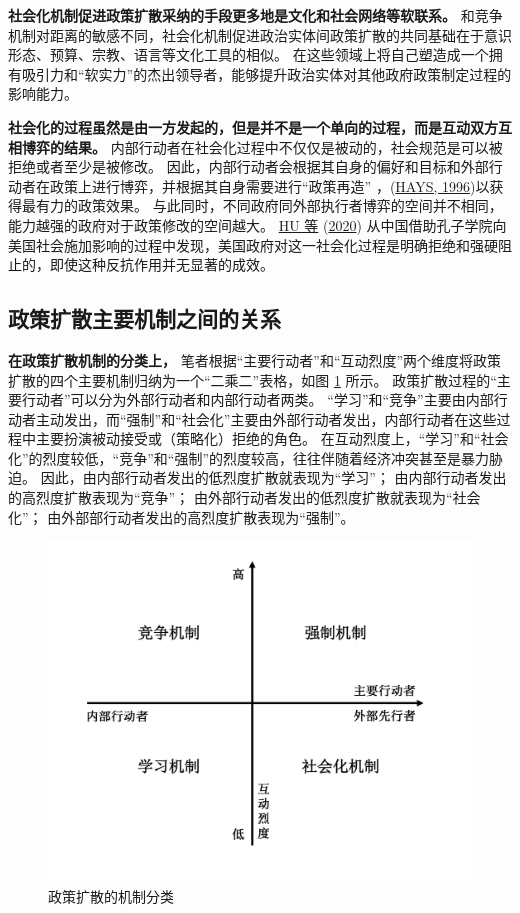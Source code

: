 \documentclass[
  12pt,
]{ctexart}
\begin{document}
\textbf{社会化机制促进政策扩散采纳的手段更多地是文化和社会网络等软联系。}
和竞争机制对距离的敏感不同，社会化机制促进政治实体间政策扩散的共同基础在于意识形态、预算、宗教、语言等文化工具的相似。
在这些领域上将自己塑造成一个拥有吸引力和``软实力''的杰出领导者，能够提升政治实体对其他政府政策制定过程的影响能力。

\textbf{社会化的过程虽然是由一方发起的，但是并不是一个单向的过程，而是互动双方互相博弈的结果。}
内部行动者在社会化过程中不仅仅是被动的，社会规范是可以被拒绝或者至少是被修改。
因此，内部行动者会根据其自身的偏好和目标和外部行动者在政策上进行博弈，并根据其自身需要进行``政策再造'' ，(\protect\hyperlink{ref-Hays1996}{HAYS, 1996})以获得最有力的政策效果。
与此同时，不同政府同外部执行者博弈的空间并不相同，能力越强的政府对于政策修改的空间越大。
\protect\hyperlink{ref-HuEtAl2020a}{HU 等} (\protect\hyperlink{ref-HuEtAl2020a}{2020}) 从中国借助孔子学院向美国社会施加影响的过程中发现，美国政府对这一社会化过程是明确拒绝和强硬阻止的，即使这种反抗作用并无显著的成效。

\hypertarget{ux653fux7b56ux6269ux6563ux4e3bux8981ux673aux5236ux4e4bux95f4ux7684ux5173ux7cfb}{%
\subsection{政策扩散主要机制之间的关系}\label{ux653fux7b56ux6269ux6563ux4e3bux8981ux673aux5236ux4e4bux95f4ux7684ux5173ux7cfb}}

\textbf{在政策扩散机制的分类上，}
笔者根据``主要行动者''和``互动烈度''两个维度将政策扩散的四个主要机制归纳为一个``二乘二''表格，如图 \ref{fig:Classification} 所示。
政策扩散过程的``主要行动者''可以分为外部行动者和内部行动者两类。
``学习''和``竞争''主要由内部行动者主动发出，而``强制''和``社会化''主要由外部行动者发出，内部行动者在这些过程中主要扮演被动接受或（策略化）拒绝的角色。
在互动烈度上，``学习''和``社会化''的烈度较低，``竞争''和``强制''的烈度较高，往往伴随着经济冲突甚至是暴力胁迫。
因此，由内部行动者发出的低烈度扩散就表现为``学习''；
由内部行动者发出的高烈度扩散表现为``竞争''；
由外部行动者发出的低烈度扩散就表现为``社会化''；
由外部部行动者发出的高烈度扩散表现为``强制''。

\begin{figure}

{\centering \includegraphics[width=0.6\linewidth]{../figures/政策扩散的机制分类} 

}

\caption{政策扩散的机制分类}\label{fig:Classification}
\end{figure}
\end{document}
